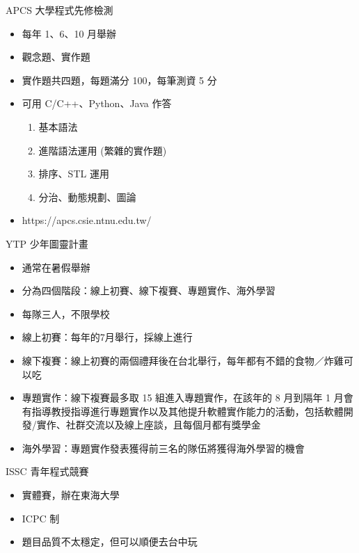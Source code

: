 \documentclass[aspectratio=169]{beamer}
\begin{document}
	\begin{frame}{APCS 大學程式先修檢測}
		\begin{itemize}
			\item 每年 1、6、10 月舉辦
			\item 觀念題、實作題
			\item 實作題共四題，每題滿分 100，每筆測資 5 分
			\item 可用 C/C++、Python、Java 作答
			\begin{enumerate}
				\item 基本語法
				\item 進階語法運用 (繁雜的實作題)
				\item 排序、STL 運用
				\item 分治、動態規劃、圖論
			\end{enumerate}
			\item https://apcs.csie.ntnu.edu.tw/
		\end{itemize}
	\end{frame}

	\begin{frame}{YTP 少年圖靈計畫}
		\begin{itemize}
			\item 通常在暑假舉辦
			\item 分為四個階段：線上初賽、線下複賽、專題實作、海外學習
			\item 每隊三人，不限學校
			\item 線上初賽：每年的7月舉行，採線上進行
			\item 線下複賽：線上初賽的兩個禮拜後在台北舉行，每年都有不錯的食物／炸雞可以吃
			\item 專題實作：線下複賽最多取 15 組進入專題實作，在該年的 8 月到隔年 1 月會有指導教授指導進行專題實作以及其他提升軟體實作能力的活動，包括軟體開發/實作、社群交流以及線上座談，且每個月都有獎學金
			\item 海外學習：專題實作發表獲得前三名的隊伍將獲得海外學習的機會
		\end{itemize}
	\end{frame}

	\begin{frame}{ISSC 青年程式競賽}
		\begin{itemize}
			\item 實體賽，辦在東海大學
			\item ICPC 制
			\item 題目品質不太穩定，但可以順便去台中玩
		\end{itemize}
	\end{frame}
\end{document}
